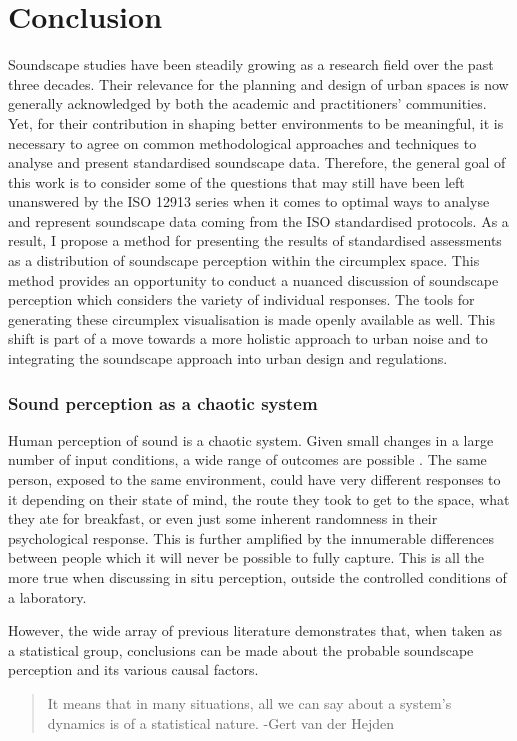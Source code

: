 \section{Conclusion}
Soundscape studies have been steadily growing as a research field over the past three decades. Their relevance for the planning and design of urban spaces is now generally acknowledged by both the academic and practitioners' communities. Yet, for their contribution in shaping better environments to be meaningful, it is necessary to agree on common methodological approaches and techniques to analyse and present standardised soundscape data. Therefore, the general goal of this work is to consider some of the questions that may still have been left unanswered by the ISO 12913 series when it comes to optimal ways to analyse and represent soundscape data coming from the ISO standardised protocols. As a result, I propose a method for presenting the results of standardised assessments as a distribution of soundscape perception within the circumplex space. This method provides an opportunity to conduct a nuanced discussion of soundscape perception which considers the variety of individual responses. The tools for generating these circumplex visualisation is made openly available as well. This shift is part of a move towards a more holistic approach to urban noise and to integrating the soundscape approach into urban design and regulations.


\subsubsection{Sound perception as a chaotic system}

Human perception of sound is a chaotic system. Given small changes in a large number of input conditions, a wide range of outcomes are possible . The same person, exposed to the same environment, could have very different responses to it depending on their state of mind, the route they took to get to the space, what they ate for breakfast, or even just some inherent randomness in their psychological response. This is further amplified by the innumerable differences between people which it will never be possible to fully capture. This is all the more true when discussing in situ perception, outside the controlled conditions of a laboratory.

However, the wide array of previous literature demonstrates that, when taken as a statistical group, conclusions can be made about the probable soundscape perception and its various causal factors.

\begin{quote}
  It means that in many situations, all we can say about a system's dynamics is of a statistical nature. -Gert van der Hejden
\end{quote}